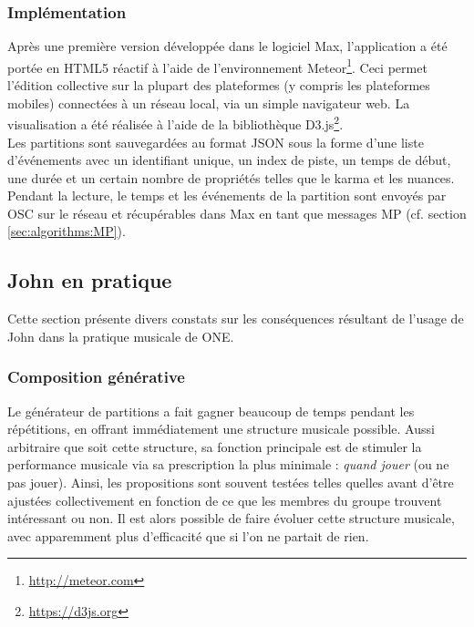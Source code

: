 \subsubsection{Implémentation}

\noindent Après une première version développée dans le logiciel Max, l'application a été portée en \gls{HTML5} réactif à l'aide de l'environnement Meteor\footnote{\url{http://meteor.com}}. Ceci permet l'édition collective sur la plupart des plateformes (y compris les plateformes mobiles) connectées à un réseau local, via un simple navigateur web. La visualisation a été réalisée à l'aide de la bibliothèque D3.js\footnote{\url{https://d3js.org}}.\\
\indent Les partitions sont sauvegardées au format \gls{JSON} sous la forme d'une liste d'événements avec un identifiant unique, un index de piste, un temps de début, une durée et un certain nombre de propriétés telles que le karma et les nuances. Pendant la lecture, le temps et les événements de la partition sont envoyés par \gls{OSC} sur le réseau et récupérables dans Max en tant que messages MP (cf. section \ref{sec:algorithms:MP}).

\subsection{John en pratique}
\noindent Cette section présente divers constats sur les conséquences résultant de l'usage de John dans la pratique musicale de ONE.

\subsubsection{Composition générative}

\noindent Le générateur de partitions a fait gagner beaucoup de temps pendant les répétitions, en offrant immédiatement une structure musicale possible. Aussi arbitraire que soit cette structure, sa fonction principale est de stimuler la performance musicale via sa prescription la plus minimale : \textit{quand jouer} (ou ne pas jouer). Ainsi, les propositions sont souvent testées telles quelles avant d'être ajustées collectivement en fonction de ce que les membres du groupe trouvent intéressant ou non. Il est alors possible de faire évoluer cette structure musicale, avec apparemment plus d'efficacité que si l'on ne partait de rien.

